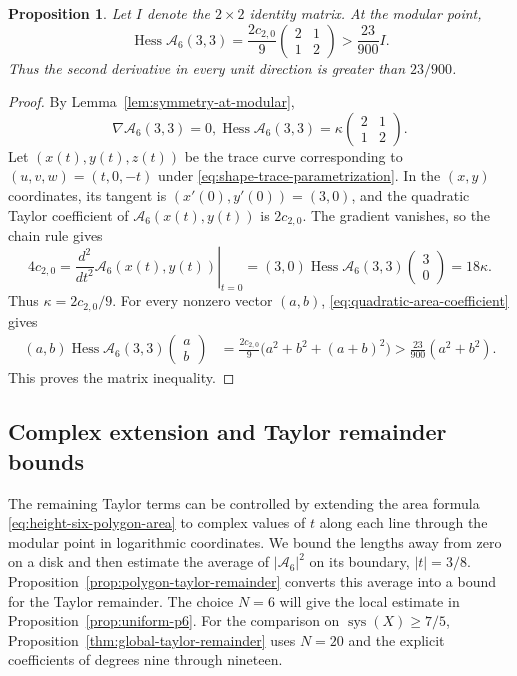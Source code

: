 \documentclass[10pt,twoside]{article}
\theoremstyle{plain}
\newtheorem{proposition}[theorem]{Proposition}
\theoremstyle{definition}
\theoremstyle{remark}
\DeclareMathOperator{\Hess}{Hess}
\DeclareMathOperator{\sys}{sys}
\newcommand{\A}{\mathcal A}
\begin{document}
\begin{proposition}
\label{prop:p6}
Let $I$ denote the $2\times2$ identity matrix. At the modular point,
$$
\Hess\A_6(3,3)
=\frac{2c_{2,0}}{9}
\begin{pmatrix}2&1\\1&2\end{pmatrix}
>\frac{23}{900}I.
$$
Thus the second derivative in every unit direction is greater
than $23/900$.
\end{proposition}
\begin{proof}
By Lemma~\ref{lem:symmetry-at-modular},
$$
\nabla\A_6(3,3)=0,
\Hess\A_6(3,3)=\kappa
\begin{pmatrix}2&1\\1&2\end{pmatrix}.
$$
Let $(x(t),y(t),z(t))$ be the trace curve corresponding to
$(u,v,w)=(t,0,-t)$ under \eqref{eq:shape-trace-parametrization}.
In the $(x,y)$ coordinates, its tangent is
$(x'(0),y'(0))=(3,0)$, and the quadratic Taylor
coefficient of $\A_6(x(t),y(t))$ is $2c_{2,0}$.
The gradient vanishes, so the chain rule gives
$$
4c_{2,0}
=\left.\frac{d^2}{dt^2}\A_6(x(t),y(t))\right|_{t=0}
=(3,0)\Hess\A_6(3,3)\begin{pmatrix}3\\0\end{pmatrix}
=18\kappa.
$$
Thus $\kappa=2c_{2,0}/9$. For every nonzero vector $(a,b)$,
\eqref{eq:quadratic-area-coefficient} gives
$$
\begin{aligned}
(a,b)\Hess\A_6(3,3)\begin{pmatrix}a\\b\end{pmatrix}
&=\frac{2c_{2,0}}{9}\bigl(a^2+b^2+(a+b)^2\bigr)>\frac{23}{900}(a^2+b^2).
\end{aligned}
$$
This proves the matrix inequality.
\end{proof}

\subsection{Complex extension and Taylor remainder bounds}
\label{sec:larger-neighborhood}

The remaining Taylor terms can be controlled by extending the
area formula \eqref{eq:height-six-polygon-area} to complex values
of $t$ along each line through the modular point in logarithmic
coordinates. We bound the lengths away from zero on a disk and
then estimate the average of $|\A_6|^2$ on its boundary,
$|t|=3/8$. Proposition~\ref{prop:polygon-taylor-remainder}
converts this average into a bound for the Taylor remainder.
The choice $N=6$ will give the local estimate in
Proposition~\ref{prop:uniform-p6}. For the comparison on
$\sys(X)\geq7/5$, Proposition~\ref{thm:global-taylor-remainder}
uses $N=20$ and the explicit coefficients of degrees nine
through nineteen.
\end{document}
